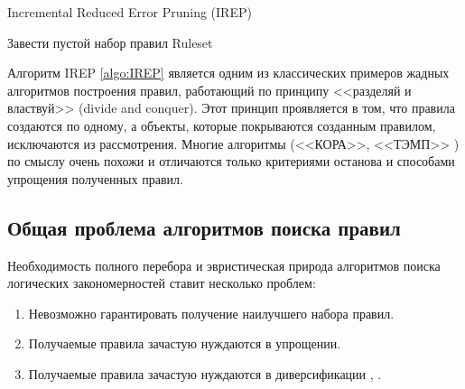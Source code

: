 \documentclass[12pt]{article}
\begin{document}
\begin{algorithm}
  \caption{Incremental Reduced Error Pruning (IREP)}\label{algo:IREP}
   {
    Завести пустой набор правил Ruleset\;
    \;
  }
\end{algorithm}

Алгоритм IREP \ref{algo:IREP} является одним из классических примеров
жадных алгоритмов построения правил, работающий по принципу <<разделяй
и властвуй>> (divide and conquer). Этот принцип проявляется в том, что
правила создаются по одному, а объекты, которые покрываются созданным
правилом, исключаются из рассмотрения. Многие алгоритмы (<<КОРА>>,
<<ТЭМП>> \cite{voron10logicalgs}) по смыслу очень похожи и отличаются
только критериями останова и способами упрощения полученных правил.

\subsection{Общая проблема алгоритмов поиска правил}

Необходимость полного перебора и эвристическая природа алгоритмов
поиска логических закономерностей ставит несколько проблем:

\begin{enumerate}
\item Невозможно гарантировать получение наилучшего набора правил.
\item Получаемые правила зачастую нуждаются в упрощении.
\item Получаемые правила зачастую нуждаются в диверсификации
  \cite{voron10logicalgs}, \cite{vainzvaig75voting}.
\end{enumerate}
\end{document}
